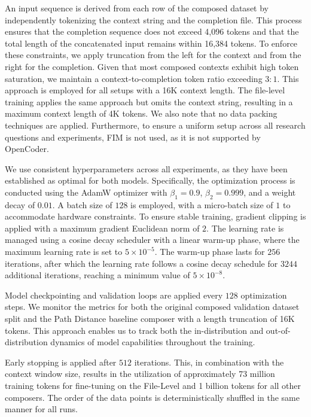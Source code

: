 An input sequence is derived from each row of the composed dataset by independently tokenizing the context string and the completion file. This process ensures that the completion sequence does not exceed 4,096 tokens and that the total length of the concatenated input remains within 16,384 tokens. To enforce these constraints, we apply truncation from the left for the context and from the right for the completion. Given that most composed contexts exhibit high token saturation, we maintain a context-to-completion token ratio exceeding \(3 : 1\). \parencite{sapronov2025} This approach is employed for all setups with a 16K context length. The file-level training applies the same approach but omits the context string, resulting in a maximum context length of 4K tokens. We also note that no data packing techniques are applied. Furthermore, to ensure a uniform setup across all research questions and experiments, FIM is not used, as it is not supported by OpenCoder.

We use consistent hyperparameters across all experiments, as they have been established as optimal for both models. Specifically, the optimization process is conducted using the AdamW optimizer with \(\beta_1 = 0.9\), \(\beta_2 = 0.999\), and a weight decay of \(0.01\). A batch size of \(128\) is employed, with a micro-batch size of \(1\) to accommodate hardware constraints. To ensure stable training, gradient clipping is applied with a maximum gradient Euclidean norm of \(2\). The learning rate is managed using a cosine decay scheduler with a linear warm-up phase, where the maximum learning rate is set to \(5 \times 10^{-5}\). The warm-up phase lasts for \(256\) iterations, after which the learning rate follows a cosine decay schedule for \(3244\) additional iterations, reaching a minimum value of \(5 \times 10^{-8}\). \parencite{sapronov2025}

Model checkpointing and validation loops are applied every \(128\) optimization steps. We monitor the metrics for both the original composed validation dataset split and the Path Distance baseline composer with a length truncation of 16K tokens. This approach enables us to track both the in-distribution and out-of-distribution dynamics of model capabilities throughout the training.

Early stopping is applied after \(512\) iterations. This, in combination with the context window size, results in the utilization of approximately 73 million training tokens for fine-tuning on the File-Level and 1 billion tokens for all other composers. The order of the data points is deterministically shuffled in the same manner for all runs.

